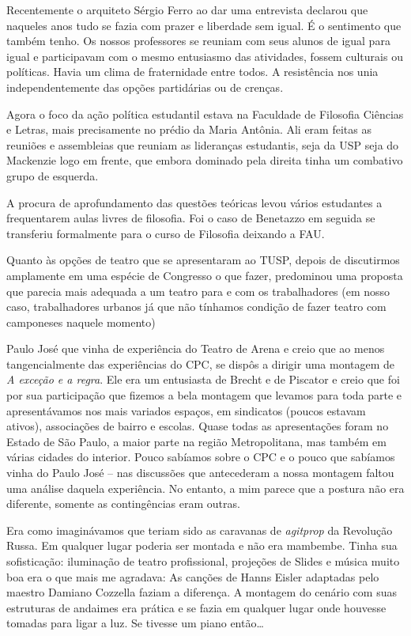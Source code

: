 Recentemente o arquiteto Sérgio Ferro ao dar uma entrevista declarou que
naqueles anos tudo se fazia com prazer e liberdade sem igual. É o
sentimento que também tenho. Os nossos professores se reuniam com seus
alunos de igual para igual e participavam com o mesmo entusiasmo das
atividades, fossem culturais ou políticas. Havia um clima de
fraternidade entre todos. A resistência nos unia independentemente das
opções partidárias ou de crenças.

Agora o foco da ação política estudantil estava na Faculdade de
Filosofia Ciências e Letras, mais precisamente no prédio da Maria
Antônia. Ali eram feitas as reuniões e assembleias que reuniam as
lideranças estudantis, seja da USP seja do Mackenzie logo em frente, que
embora dominado pela direita tinha um combativo grupo de esquerda.

A procura de aprofundamento das questões teóricas levou vários
estudantes a frequentarem aulas livres de filosofia. Foi o caso de
Benetazzo em seguida se transferiu formalmente para o curso de Filosofia
deixando a FAU.

Quanto às opções de teatro que se apresentaram ao TUSP, depois de
discutirmos amplamente em uma espécie de Congresso o que fazer,
predominou uma proposta que parecia mais adequada a um teatro para e com
os trabalhadores (em nosso caso, trabalhadores urbanos já que não
tínhamos condição de fazer teatro com camponeses naquele momento)

Paulo José que vinha de experiência do Teatro de Arena e creio que ao
menos tangencialmente das experiências do CPC, se dispôs a dirigir uma
montagem de \textit{A exceção e a regra}. Ele era um entusiasta de Brecht e
de Piscator e creio que foi por sua participação que fizemos a bela
montagem que levamos para toda parte e apresentávamos nos mais variados
espaços, em sindicatos (poucos estavam ativos), associações de bairro e
escolas. Quase todas as apresentações foram no Estado de São Paulo, a
maior parte na região Metropolitana, mas também em várias cidades do
interior. Pouco sabíamos sobre o CPC e o pouco que sabíamos vinha do
Paulo José -- nas discussões que antecederam a nossa montagem faltou uma
análise daquela experiência. No entanto, a mim parece que a postura não
era diferente, somente as contingências eram outras.

Era como imaginávamos que teriam sido as caravanas de \textit{agitprop} da
Revolução Russa. Em qualquer lugar poderia ser montada e não era
mambembe. Tinha sua sofisticação: iluminação de teatro profissional,
projeções de Slides e música muito boa era o que mais me agradava: As
canções de Hanns Eisler adaptadas pelo maestro Damiano Cozzella faziam a
diferença. A montagem do cenário com suas estruturas de andaimes era
prática e se fazia em qualquer lugar onde houvesse tomadas para ligar a
luz. Se tivesse um piano então\ldots{}

